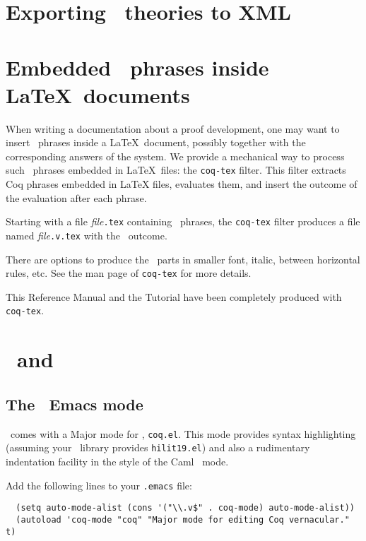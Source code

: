 \section{Exporting \Coq\ theories to XML}



\section[Embedded \Coq\ phrases inside \LaTeX\ documents]{Embedded \Coq\ phrases inside \LaTeX\ documents\label{Latex}
  }

When writing a documentation about a proof development, one may want
to insert \Coq\ phrases inside a \LaTeX\ document, possibly together with
the corresponding answers of the system. We provide a
mechanical way to process such \Coq\ phrases embedded in \LaTeX\ files: the
{\tt coq-tex} filter.  This filter extracts Coq phrases embedded in
LaTeX files, evaluates them, and insert the outcome of the evaluation
after each phrase.

Starting with a file {\em file}{\tt.tex} containing \Coq\ phrases,
the {\tt coq-tex} filter produces a file named {\em file}{\tt.v.tex} with
the \Coq\ outcome. 

There are options to produce the \Coq\ parts in smaller font, italic,
between horizontal rules, etc.
See the man page of {\tt coq-tex} for more details.

\medskip{} This Reference Manual and the Tutorial
have been completely produced with {\tt coq-tex}.


\section[\Coq\ and \emacs]{\Coq\ and \emacs\label{Emacs}}

\subsection{The \Coq\ Emacs mode}

\Coq\ comes with a Major mode for \emacs, {\tt coq.el}. This mode provides
syntax highlighting (assuming your \emacs\ library provides
{\tt hilit19.el}) and also a rudimentary indentation facility
in the style of the Caml \emacs\ mode.

Add the following lines to your \verb!.emacs! file:

\begin{verbatim}
  (setq auto-mode-alist (cons '("\\.v$" . coq-mode) auto-mode-alist))
  (autoload 'coq-mode "coq" "Major mode for editing Coq vernacular." t)
\end{verbatim}

